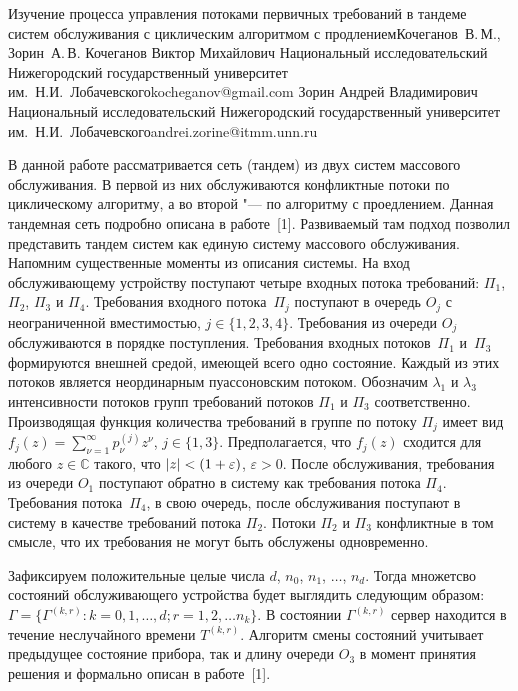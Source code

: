 
\begin{ptkarticle}[russian]%
{Изучение процесса управления потоками первичных требований в тандеме систем обслуживания с циклическим алгоритмом с продлением}{Кочеганов~В.\,М., Зорин~А.\,В.}
\TwoAuthor%
{Кочеганов Виктор Михайлович}%
{Национальный исследовательский Нижегородский государственный университет им.~Н.И.~Лобачевского}{kocheganov@gmail.com}%
{Зорин Андрей Владимирович}%
{Национальный исследовательский Нижегородский государственный университет им.~Н.И.~Лобачевского}{andrei.zorine@itmm.unn.ru}


В данной работе рассматривается сеть (тандем) из двух систем массового
обслуживания. В первой из них обслуживаются конфликтные потоки по циклическому
алгоритму, а во второй "--- по алгоритму с проедлением. Данная тандемная сеть
подробно описана в работе~[1]. Развиваемый там подход позволил представить
тандем систем как единую систему массового обслуживания. Напомним существенные
моменты из описания системы.  На вход обслуживающему устройству поступают четыре
входных потока требований: $\Pi_1$, $\Pi_2$, $\Pi_3$ и $\Pi_4$.  Требования
входного потока~$\Pi_j$ поступают в очередь $O_j$ с неограниченной вместимостью,
$j \in \{1,2,3,4\}$. Требования из очереди $O_j$ обслуживаются в порядке
поступления. Требования входных потоков~$\Pi_1$ и~$\Pi_3$ формируются внешней
средой, имеющей всего одно состояние. Каждый из этих потоков является
неординарным пуассоновским потоком. Обозначим $\lambda_1$ и $\lambda_3$
интенсивности потоков групп требований потоков $\Pi_1$ и $\Pi_3$
соответственно. Производящая функция количества требований в группе по потоку
$\Pi_j$ имеет вид $f_j(z) = \sum_{\nu=1}^{\infty} p_{\nu}^{(j)} z ^{\nu}$, $j\in
\{1,3\}$.  Предполагается, что $f_j(z)$ сходится для любого $z\in \mathbb{C}$
такого, что $|z|<\nobreak\discretionary{}{\hbox{$\mathsurround=0pt
    <$}}{}(1+\varepsilon)$, $\varepsilon>0$. После обслуживания, требования из
очереди $O_1$ поступают обратно в систему как требования потока
$\Pi_4$. Требования потока~$\Pi_4$, в свою очередь, после обслуживания поступают
в систему в качестве требований потока $\Pi_2$. Потоки $\Pi_2$ и $\Pi_3$
конфликтные в том смысле, что их требования не могут быть обслужены
одновременно. 

Зафиксируем положительные целые числа $d$, $n_0$, $n_1$, $\ldots$,
$n_d$. Тогда множетсво состояний обслуживающего устройства будет выглядить следующим образом: $\Gamma=\{\Gamma^{(k,r)} \colon k=0,1,\ldots,d; r=1,2,\ldots
n_k\}$. В состоянии  $\Gamma^{(k,r)}$ сервер находится в течение неслучайного
времени  $T^{(k,r)}$. Алгоритм смены состояний учитывает предыдущее
состояние прибора, так и длину очереди $O_3$ в момент принятия решения и
формально описан в работе~[1]. 


\end{ptkarticle}
